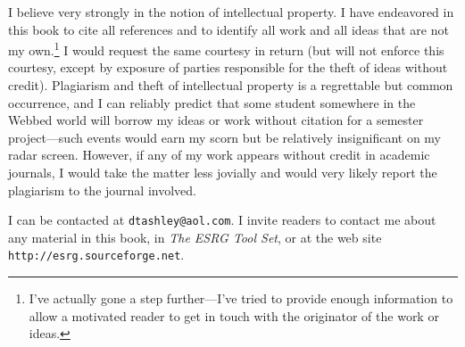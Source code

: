 I believe very
strongly in the notion of intellectual property.  I have endeavored
in this book to cite all references and to identify all work and
all ideas that are not my own.\footnote{I've actually gone a step
further---I've tried to provide enough information to allow a
motivated reader to get in touch with the originator of the work
or ideas.}  I would request the same courtesy in return (but will
not enforce this courtesy, except by exposure of parties responsible
for the theft of ideas without credit).  Plagiarism and theft of intellectual property is a 
regrettable but common occurrence, and I can
reliably predict that some student somewhere in the Webbed world
will borrow my ideas or work without citation
for a semester project---such events would earn my scorn 
but be relatively insignificant
on my radar screen.  However, if any of my work appears without
credit in academic journals, I would take the matter less
jovially and would very likely report the plagiarism to the journal 
involved.

I 
can be contacted at \texttt{dtashley@aol.com}.  I invite readers
to contact me about
any material in this book, in \emph{The ESRG Tool Set}, or at
the web site \texttt{http://esrg.sourceforge.net}.

